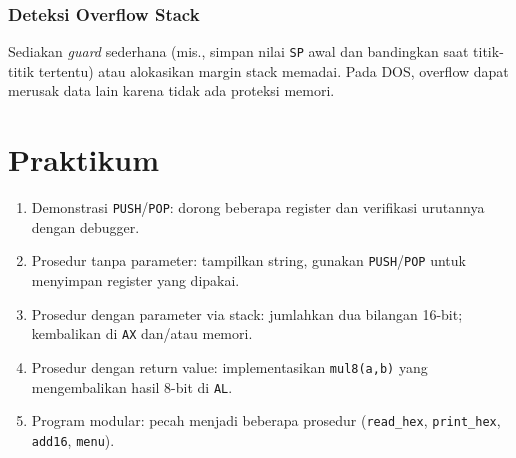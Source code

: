 \subsubsection{Deteksi Overflow Stack}
Sediakan \textit{guard} sederhana (mis., simpan nilai \texttt{SP} awal dan bandingkan saat titik-titik tertentu) atau alokasikan margin stack memadai. Pada DOS, overflow dapat merusak data lain karena tidak ada proteksi memori. \cite{osdev_wiki}

\section{Praktikum}
\begin{enumerate}
  \item Demonstrasi \texttt{PUSH}/\texttt{POP}: dorong beberapa register dan verifikasi urutannya dengan debugger.
  \item Prosedur tanpa parameter: tampilkan string, gunakan \texttt{PUSH}/\texttt{POP} untuk menyimpan register yang dipakai.
  \item Prosedur dengan parameter via stack: jumlahkan dua bilangan 16-bit; kembalikan di \texttt{AX} dan/atau memori.
  \item Prosedur dengan return value: implementasikan \texttt{mul8(a,b)} yang mengembalikan hasil 8-bit di \texttt{AL}.
  \item Program modular: pecah menjadi beberapa prosedur (\texttt{read\_hex}, \texttt{print\_hex}, \texttt{add16}, \texttt{menu}).
\end{enumerate}

